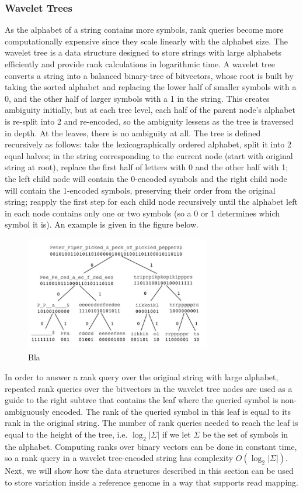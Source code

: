 \documentclass[runningheads,a4paper]{llncs}
\begin{document}
\subsubsection{Wavelet Trees}
As the alphabet of a string contains more symbols, rank queries become more computationally expensive since they scale linearly with the alphabet size. The wavelet tree is a data structure designed to store strings with large alphabets efficiently and provide rank calculations in logarithmic time. A wavelet tree converts a string into a balanced binary-tree of bitvectors, whose root is built by taking the sorted alphabet and replacing the lower half of smaller symbols with a 0, and the other half of larger symbols with a 1 in the string. This creates ambiguity initially, but at each tree level, each half of the parent node's alphabet is re-split into 2 and re-encoded, so the ambiguity lessens as the tree is traversed in depth. At the leaves, there is no ambiguity at all. The tree is defined recursively as follows: take the lexicographically ordered alphabet, split it into 2 equal halves; in the string corresponding to the current node (start with original string at root), replace the first half of letters with 0 and the other half with 1; the left child node will contain the 0-encoded symbols and the right child node will contain the 1-encoded symbols, preserving their order from the original string; reapply the first step for each child node recursively until the alphabet left in each node contains only one or two symbols (so a 0 or 1 determines which symbol it is). An example is given in the figure below.

 \begin{figure}
\centering
\includegraphics[height=5cm]{wt}
\caption{Bla}
\label{fig:wt}
\end{figure}

In order to answer a rank query over the original string with large alphabet, repeated rank queries over the bitvectors in the wavelet tree nodes are used as a guide to the right subtree that contains the leaf where the queried symbol is non-ambiguously encoded. The rank of the queried symbol in this leaf is equal to its rank in the original string. The number of rank queries needed to reach the leaf is equal to the height of the tree, i.e. $\log_{2} {|\Sigma|}$ if we let $\Sigma$ be the set of symbols in the alphabet. Computing ranks over binary vectors can be done in constant time, so a rank query in a wavelet tree-encoded string has complexity $O(\log_{2} {|\Sigma|})$. Next, we will show how the data structures described in this section can be used to store variation inside a reference genome in a way that supports read mapping.
\end{document}
